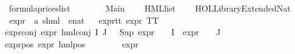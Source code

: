 %
\begin{isabellebody}%
%
%
\isadelimtheory
%
\endisadelimtheory
%
\isatagtheory
{}\isamarkupfalse%
\ formula{\isacharunderscore}{\kern0pt}prices{\isacharunderscore}{\kern0pt}list\isanewline
\ \ \ \isanewline
\ \ \ \ Main\isanewline
\ \ \ \ HML{\isacharunderscore}{\kern0pt}list\isanewline
\ \ \ \ {\isachardoublequoteopen}HOL{\isacharminus}{\kern0pt}Library{\isachardot}{\kern0pt}Extended{\isacharunderscore}{\kern0pt}Nat{\isachardoublequoteclose}\isanewline
{}%
\endisatagtheory
{\isafoldtheory}%
%
\isadelimtheory
\isanewline
%
\endisadelimtheory
\isanewline
{}\isamarkupfalse%
\ expr{\isacharunderscore}{\kern0pt}{}\ {\isacharcolon}{\kern0pt}{\isacharcolon}{\kern0pt}\ {\isachardoublequoteopen}{\isacharparenleft}{\kern0pt}{\isacharprime}{\kern0pt}a{\isacharcomma}{\kern0pt}\ {\isacharprime}{\kern0pt}s{\isacharparenright}{\kern0pt}hml\ {\isasymRightarrow}\ enat{\isachardoublequoteclose}\isanewline
\ \ \isanewline
expr{\isacharunderscore}{\kern0pt}{}{\isacharunderscore}{\kern0pt}tt{\isacharcolon}{\kern0pt}\ {\isacartoucheopen}expr{\isacharunderscore}{\kern0pt}{}\ TT\ {\isacharequal}{\kern0pt}\ {}{\isacartoucheclose}\ {\isacharbar}{\kern0pt}\isanewline
expr{\isacharunderscore}{\kern0pt}{}{\isacharunderscore}{\kern0pt}conj{\isacharcolon}{\kern0pt}\ {\isacartoucheopen}expr{\isacharunderscore}{\kern0pt}{}\ {\isacharparenleft}{\kern0pt}hml{\isacharunderscore}{\kern0pt}conj\ I\ J\ {\isasymPhi}{\isacharparenright}{\kern0pt}\ {\isacharequal}{\kern0pt}\ Sup\ {\isacharparenleft}{\kern0pt}{\isacharparenleft}{\kern0pt}expr{\isacharunderscore}{\kern0pt}{}\ {\isasymcirc}\ {\isasymPhi}{\isacharparenright}{\kern0pt}\ {\isacharbackquote}{\kern0pt}\ I\ {\isasymunion}\ {\isacharparenleft}{\kern0pt}expr{\isacharunderscore}{\kern0pt}{}\ {\isasymcirc}\ {\isasymPhi}{\isacharparenright}{\kern0pt}\ {\isacharbackquote}{\kern0pt}\ J{\isacharparenright}{\kern0pt}{\isacartoucheclose}\ {\isacharbar}{\kern0pt}\isanewline
expr{\isacharunderscore}{\kern0pt}{}{\isacharunderscore}{\kern0pt}pos{\isacharcolon}{\kern0pt}\ {\isacartoucheopen}expr{\isacharunderscore}{\kern0pt}{}\ {\isacharparenleft}{\kern0pt}hml{\isacharunderscore}{\kern0pt}pos\ {\isasymalpha}\ {\isasymphi}{\isacharparenright}{\kern0pt}\ {\isacharequal}{\kern0pt}\ \isanewline
\ \ {}\ {\isacharplus}{\kern0pt}\ {\isacharparenleft}{\kern0pt}expr{\isacharunderscore}{\kern0pt}{}\ {\isasymphi}{\isacharparenright}{\kern0pt}{\isacartoucheclose}\isanewline

\end{isabellebody}
